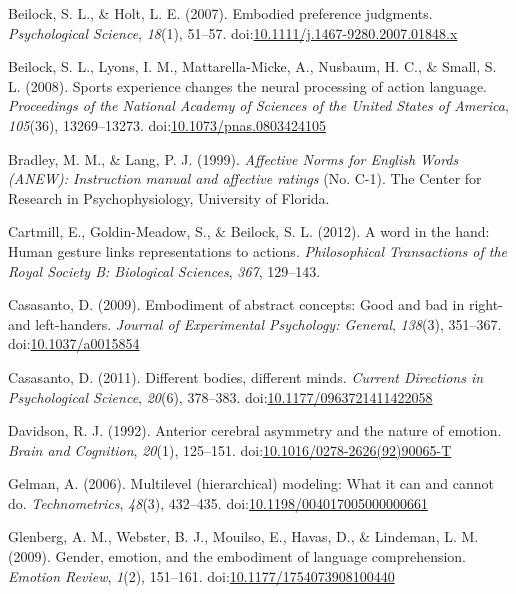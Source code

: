 \documentclass[english,man, mask]{apa6}
\theoremstyle{definition}
\theoremstyle{definition}
\theoremstyle{definition}
\theoremstyle{remark}
\begin{document}
\hypertarget{ref-Beilock2007}{}
Beilock, S. L., \& Holt, L. E. (2007). Embodied preference judgments.
\emph{Psychological Science}, \emph{18}(1), 51--57.
doi:\href{https://doi.org/10.1111/j.1467-9280.2007.01848.x}{10.1111/j.1467-9280.2007.01848.x}

\hypertarget{ref-Beilock2008}{}
Beilock, S. L., Lyons, I. M., Mattarella-Micke, A., Nusbaum, H. C., \&
Small, S. L. (2008). Sports experience changes the neural processing of
action language. \emph{Proceedings of the National Academy of Sciences
of the United States of America}, \emph{105}(36), 13269--13273.
doi:\href{https://doi.org/10.1073/pnas.0803424105}{10.1073/pnas.0803424105}

\hypertarget{ref-Bradley1999}{}
Bradley, M. M., \& Lang, P. J. (1999). \emph{Affective Norms for English
Words (ANEW): Instruction manual and affective ratings} (No. C-1). The
Center for Research in Psychophysiology, University of Florida.

\hypertarget{ref-Cartmill2012}{}
Cartmill, E., Goldin-Meadow, S., \& Beilock, S. L. (2012). A word in the
hand: Human gesture links representations to actions.
\emph{Philosophical Transactions of the Royal Society B: Biological
Sciences}, \emph{367}, 129--143.

\hypertarget{ref-Casasanto2009}{}
Casasanto, D. (2009). Embodiment of abstract concepts: Good and bad in
right- and left-handers. \emph{Journal of Experimental Psychology:
General}, \emph{138}(3), 351--367.
doi:\href{https://doi.org/10.1037/a0015854}{10.1037/a0015854}

\hypertarget{ref-Casasanto2011}{}
Casasanto, D. (2011). Different bodies, different minds. \emph{Current
Directions in Psychological Science}, \emph{20}(6), 378--383.
doi:\href{https://doi.org/10.1177/0963721411422058}{10.1177/0963721411422058}

\hypertarget{ref-Davidson1992}{}
Davidson, R. J. (1992). Anterior cerebral asymmetry and the nature of
emotion. \emph{Brain and Cognition}, \emph{20}(1), 125--151.
doi:\href{https://doi.org/10.1016/0278-2626(92)90065-T}{10.1016/0278-2626(92)90065-T}

\hypertarget{ref-Gelman2006}{}
Gelman, A. (2006). Multilevel (hierarchical) modeling: What it can and
cannot do. \emph{Technometrics}, \emph{48}(3), 432--435.
doi:\href{https://doi.org/10.1198/004017005000000661}{10.1198/004017005000000661}

\hypertarget{ref-Glenberg2009}{}
Glenberg, A. M., Webster, B. J., Mouilso, E., Havas, D., \& Lindeman, L.
M. (2009). Gender, emotion, and the embodiment of language
comprehension. \emph{Emotion Review}, \emph{1}(2), 151--161.
doi:\href{https://doi.org/10.1177/1754073908100440}{10.1177/1754073908100440}
\end{document}
